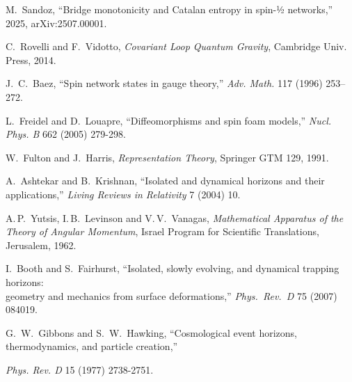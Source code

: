 \documentclass[11pt]{article}
\begin{document}
\begin{thebibliography}{8}

 M.~Sandoz, “Bridge monotonicity and Catalan entropy in spin-½ networks,” 2025, arXiv:2507.00001.

 C.~Rovelli and F.~Vidotto, \emph{Covariant Loop Quantum Gravity}, Cambridge Univ. Press, 2014.

 J.~C.~Baez, “Spin network states in gauge theory,” \emph{Adv. Math.} 117 (1996) 253–272.

 L.~Freidel and D.~Louapre, ``Diffeomorphisms and spin foam models,'' \emph{Nucl. Phys. B} 662 (2005) 279-298.

 W.~Fulton and J.~Harris, \emph{Representation Theory}, Springer GTM 129, 1991.

 A.~Ashtekar and B.~Krishnan, “Isolated and dynamical horizons and their applications,” \emph{Living Reviews in Relativity} 7 (2004) 10.

A.\,P.~Yutsis, I.\,B.~Levinson and V.\,V.~Vanagas,
\emph{Mathematical Apparatus of the Theory of Angular Momentum},
Israel Program for Scientific Translations, Jerusalem, 1962.

  I.~Booth and S.~Fairhurst, “Isolated, slowly evolving, and dynamical trapping horizons:\\
  geometry and mechanics from surface deformations,”
  \emph{Phys.\ Rev.\ D} 75 (2007) 084019.


G.~W.~Gibbons and S.~W.~Hawking, “Cosmological event horizons, thermodynamics, and particle creation,”

\emph{Phys. Rev. D} 15 (1977) 2738-2751.

\end{thebibliography}
\end{document}
